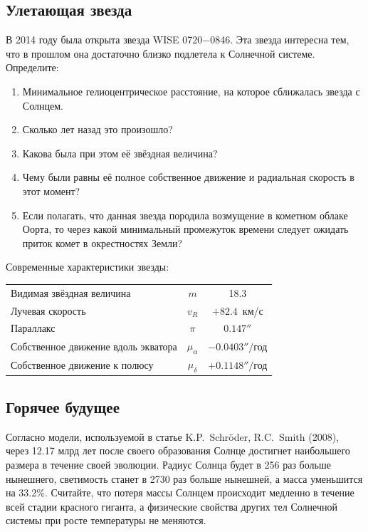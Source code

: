 \documentclass[12pt]{article}
\begin{document}
\subsection{Улетающая звезда}
В 2014 году была открыта звезда WISE 0720$-$0846. Эта звезда интересна тем, что в
прошлом она достаточно близко подлетела к Солнечной системе. Определите:
\begin{enumerate}
  \item Минимальное гелиоцентрическое расстояние, на которое сближалась звезда с Солнцем.
  \item Сколько лет назад это произошло?
  \item Какова была при этом её звёздная величина?
  \item Чему были равны её полное собственное движение и радиальная скорость в этот момент?
  \item Если полагать, что данная звезда породила возмущение в кометном облаке Оорта,
        то через какой минимальный промежуток времени следует ожидать приток комет в
        окрестностях Земли?
\end{enumerate}

Современные характеристики звезды:
\begin{center}
\begin{tabular}{lcc}
Видимая звёздная величина & $m$ & 18.3 \\
Лучевая скорость & $v_R$ & $+82.4$~км/с \\
Параллакс & $\pi$ & $0.147''$ \\
Собственное движение вдоль экватора & $\mu_\alpha$ & $-0.0403''/\text{год}$ \\
Собственное движение к полюсу & $\mu_\delta$ & $+0.1148''/\text{год}$ \\
\end{tabular}
\end{center}

\subsection{Горячее будущее}
Согласно модели, используемой в статье K.P.~Schröder, R.C.~Smith (2008), через
12.17 млрд лет после своего образования Солнце достигнет наибольшего размера в
течение своей эволюции. Радиус Солнца будет в 256 раз больше нынешнего, светимость
станет в 2730 раз больше нынешней, а масса уменьшится на 33.2\%. Считайте, что потеря
массы Солнцем происходит медленно в течение всей стадии красного гиганта, а
физические свойства других тел Солнечной системы при росте температуры не меняются.
\end{document}
